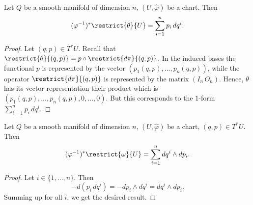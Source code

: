 \begin{proposition}
  Let
    $Q$ be a smooth manifold of dimension $n$,
    $(U, \hat{\varphi})$ be a chart.
  Then
  \begin{equation}
    (\varphi^{-1})^* \restrict{\theta}{U} = \sum_{i = 1}^n p_i\, d q^i.
  \end{equation}
\end{proposition}
\begin{proof}
  Let $(q, p) \in T^* U$.
  Recall that $\restrict{\theta}{(q, p)} = p \circ \restrict{d \pi}{(q, p)}$.
  In the induced bases
  the functional $p$ is represented by the vector $(p_1(q, p), ..., p_n(q, p))$,
  while the operator $\restrict{d \pi}{(q, p)}$ is represented by the matrix
  $(I_n\, O_n)$.
  Hence, $\theta$ has its vector representation their product which is
  $(p_1(q, p), ..., p_n(q, p), 0, ..., 0)$.
  But this corresponds to the $1$-form $\sum_{i = 1}^n p_i\, d q^i$.
\end{proof}
\begin{corollary}
  Let
    $Q$ be a smooth manifold of dimension $n$,
    $(U, \hat{\varphi})$ be a chart,
    $(q, p) \in T^* U$.
  Then
  \begin{equation}
    (\varphi^{-1})^* \restrict{\omega}{U} = \sum_{i = 1}^n d q^i \wedge d p_i.
  \end{equation}
\end{corollary}
\begin{proof}
  Let $i \in \{1, ..., n\}$.
  Then
  \begin{equation}
    - d(p_i\, d q^i) = - d p_i \wedge d q^i = d q^i \wedge d p_i.
  \end{equation}
  Summing up for all $i$, we get the desired result.
\end{proof}
